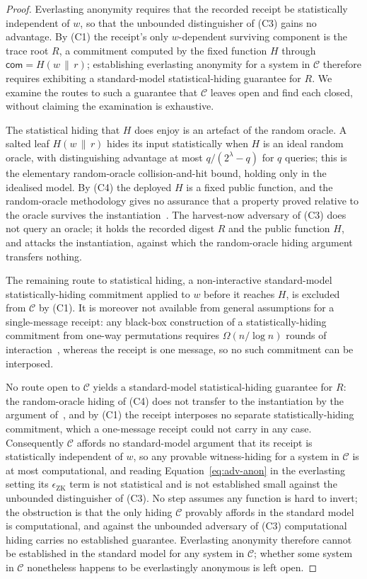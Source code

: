 \begin{proof}
    Everlasting anonymity requires that the recorded receipt be statistically independent of $w$, so that the unbounded distinguisher of (C3) gains no advantage. By (C1) the receipt's only $w$-dependent surviving component is the trace root $R$, a commitment computed by the fixed function $H$ through $\mathsf{com}=H(w\,\|\,r)$; establishing everlasting anonymity for a system in $\mathcal C$ therefore requires exhibiting a standard-model statistical-hiding guarantee for $R$. We examine the routes to such a guarantee that $\mathcal C$ leaves open and find each closed, without claiming the examination is exhaustive.
    
    The statistical hiding that $H$ does enjoy is an artefact of the random oracle. A salted leaf $H(w\,\|\,r)$ hides its input statistically when $H$ is an ideal random oracle, with distinguishing advantage at most $q/(2^\lambda-q)$ for $q$ queries; this is the elementary random-oracle collision-and-hit bound, holding only in the idealised model. By (C4) the deployed $H$ is a fixed public function, and the random-oracle methodology gives no assurance that a property proved relative to the oracle survives the instantiation~\cite{cgh2004rom}. The harvest-now adversary of (C3) does not query an oracle; it holds the recorded digest $R$ and the public function $H$, and attacks the instantiation, against which the random-oracle hiding argument transfers nothing.
    
    The remaining route to statistical hiding, a non-interactive standard-model statistically-hiding commitment applied to $w$ before it reaches $H$, is excluded from $\mathcal C$ by (C1). It is moreover not available from general assumptions for a single-message receipt: any black-box construction of a statistically-hiding commitment from one-way permutations requires $\Omega(n/\log n)$ rounds of interaction~\cite{hhrs2007,wee2007tcc}, whereas the receipt is one message, so no such commitment can be interposed.
    
    No route open to $\mathcal C$ yields a standard-model statistical-hiding guarantee for $R$: the random-oracle hiding of (C4) does not transfer to the instantiation by the argument of~\cite{cgh2004rom}, and by (C1) the receipt interposes no separate statistically-hiding commitment, which a one-message receipt could not carry in any case. Consequently $\mathcal C$ affords no standard-model argument that its receipt is statistically independent of $w$, so any provable witness-hiding for a system in $\mathcal C$ is at most computational, and reading Equation~\eqref{eq:adv-anon} in the everlasting setting its $\epsilon_{\mathrm{ZK}}$ term is not statistical and is not established small against the unbounded distinguisher of (C3). No step assumes any function is hard to invert; the obstruction is that the only hiding $\mathcal C$ provably affords in the standard model is computational, and against the unbounded adversary of (C3) computational hiding carries no established guarantee. Everlasting anonymity therefore cannot be established in the standard model for any system in $\mathcal C$; whether some system in $\mathcal C$ nonetheless happens to be everlastingly anonymous is left open.
\end{proof}

